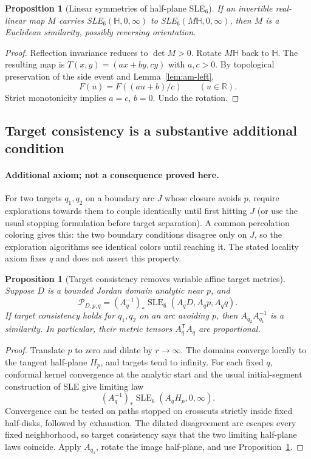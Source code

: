\documentclass[11pt]{article}
\newtheorem{proposition}[theorem]{Proposition}
\theoremstyle{definition}\newtheorem{definition}[theorem]{Definition}
\theoremstyle{remark}\newtheorem{remark}[theorem]{Remark}
\begin{document}
\begin{proposition}[Linear symmetries of half-plane SLE$_6$]
\label{prop:am-linear}
If an invertible real-linear map $M$ carries SLE$_6(\mathbb H,0,\infty)$
to SLE$_6(M\mathbb H,0,\infty)$, then $M$ is a Euclidean similarity,
possibly reversing orientation.
\end{proposition}
\begin{proof}
Reflection invariance reduces to $\det M>0$. Rotate $M\mathbb H$ back to
$\mathbb H$. The resulting map is
$T(x,y)=(ax+by,cy)$ with $a,c>0$. By topological preservation of the side
event and Lemma~\ref{lem:am-left},
\[
 F(u)=F((au+b)/c)\qquad(u\in\mathbb R).
\]
Strict monotonicity implies $a=c$, $b=0$. Undo the rotation.
\end{proof}

\subsection{Target consistency is a substantive additional condition}

\paragraph{Additional axiom; not a consequence proved here.}
For two targets $q_1,q_2$ on a boundary arc $J$ whose closure avoids $p$,
require explorations towards them to couple identically until first
hitting $J$ (or use the usual stopping formulation before target separation).
A common percolation coloring gives this: the two boundary conditions
disagree only on $J$, so the exploration algorithms see identical colors
until reaching it. The stated locality axiom fixes $q$ and does not assert
this property.

\begin{proposition}[Target consistency removes variable affine target metrics]
\label{prop:am-targetconsistency}
Suppose $D$ is a bounded Jordan domain analytic near $p$, and
\[
 \mathcal P_{D,p,q}=(A_q^{-1})_*\operatorname{SLE}_6(A_qD,A_qp,A_qq).
\]
If target consistency holds for $q_1,q_2$ on an arc avoiding $p$, then
$A_{q_2}A_{q_1}^{-1}$ is a similarity. In particular, their metric tensors
$A_q^{\mathsf T}A_q$ are proportional.
\end{proposition}
\begin{proof}
Translate $p$ to zero and dilate by $r\to\infty$. The domains converge
locally to the tangent half-plane $H_p$, and targets tend to infinity.
For each fixed $q$, conformal kernel convergence at the analytic start
and the usual initial-segment construction of SLE give limiting law
\[
 (A_q^{-1})_*\operatorname{SLE}_6(A_qH_p,0,\infty).
\]
Convergence can be tested on paths stopped on crosscuts strictly inside
fixed half-disks, followed by exhaustion. The dilated disagreement arc
escapes every fixed neighborhood, so target consistency says that the
two limiting half-plane laws coincide. Apply $A_{q_1}$, rotate the image
half-plane, and use Proposition~\ref{prop:am-linear}.
\end{proof}
\end{document}
